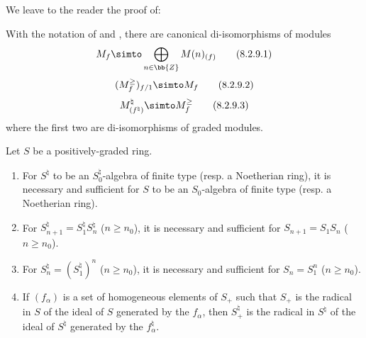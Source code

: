 We leave to the reader the proof of:
\begin{lemma}[8.2.9]
\label{II.8.2.9}
With the notation of  and , there are canonical di-isomorphisms of modules
\[
\label{II.8.2.9.1}
  M_f \simto \bigoplus_{n\in\bb{Z}} M(n)_{(f)}
\tag{8.2.9.1}
\]
\[
\label{II.8.2.9.2}
  (M_f^\geq)_{f/1} \simto M_f
\tag{8.2.9.2}
\]
\[
\label{II.8.2.9.3}
  M_{(f^\natural)}^\natural \simto M_f^\geq
\tag{8.2.9.3}
\]
where the first two are di-isomorphisms of graded modules.
\end{lemma}

\begin{lemma}[8.2.10]
\label{II.8.2.10}
Let $S$ be a positively-graded ring.
\begin{enumerate}
  \item[\rm{(i)}] For $S^\natural$ to be an $S_0^\natural$-algebra of finite type (resp. a Noetherian ring), it is necessary and sufficient for $S$ to be an $S_0$-algebra of finite type (resp. a Noetherian ring).
  \item[\rm{(ii)}] For $S_{n+1}^\natural = S_1^\natural S_n^\natural$ ($n\geq n_0$), it is necessary and sufficient for $S_{n+1}=S_1S_n$ ($n\geq n_0$).
  \item[\rm{(iii)}] For $S_n^\natural = (S_1^\natural)^n$ ($n\geq n_0$), it is necessary and sufficient for $S_n=S_1^n$ ($n\geq n_0$).
  \item[\rm{(iv)}] If $(f_\alpha)$ is a set of homogeneous elements of $S_+$ such that $S_+$ is the radical in $S$ of the ideal of $S$ generated by the $f_\alpha$, then $S_+^\natural$ is the radical in $S^\natural$ of the ideal of $S^\natural$ generated by the $f_\alpha^\natural$.
\end{enumerate}
\end{lemma}

